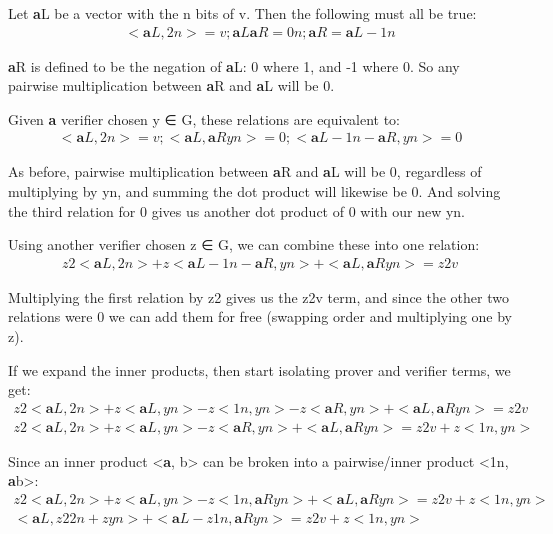 \documentclass{article}
\begin{document}
Let \textbf{a}L be a vector with the n bits of v.  Then the following must all be true:
\begin{eqnarray}
  <\textbf{a}L, 2n> = v ; \textbf{a}L \textbf{a}R = 0n ; \textbf{a}R = \textbf{a}L - 1n
\end{eqnarray}
  
\textbf{a}R is defined to be the negation of \textbf{a}L: 0 where 1, and -1 where 0.  So any pairwise multiplication between \textbf{a}R and \textbf{a}L will be 0.

Given \textbf{a} verifier chosen y ∈ G, these relations are equivalent to:
\begin{eqnarray}
  <\textbf{a}L, 2n> = v ; <\textbf{a}L,  \textbf{a}Ryn> = 0 ; <\textbf{a}L - 1n - \textbf{a}R, yn> = 0
\end{eqnarray}

As before, pairwise multiplication between \textbf{a}R and \textbf{a}L will be 0, regardless of multiplying by yn, and summing the dot product will likewise be 0. And solving the third relation for 0 gives us another dot product of 0 with our new yn.

Using another verifier chosen z ∈ G, we can combine these into one relation:
\begin{eqnarray}
  z2 <\textbf{a}L, 2n> + z <\textbf{a}L - 1n - \textbf{a}R, yn> + <\textbf{a}L,  \textbf{a}Ryn> = z2 v
\end{eqnarray}

Multiplying the first relation by z2 gives us the z2v term, and since the other two relations were 0 we can add them for free (swapping order and multiplying one by z).

If we expand the inner products, then start isolating prover and verifier terms, we get:
\begin{eqnarray}
  z2 <\textbf{a}L, 2n> + z <\textbf{a}L, yn> - z <1n, yn> - z <\textbf{a}R, yn> + <\textbf{a}L,  \textbf{a}Ryn> = z2 v\\
  z2 <\textbf{a}L, 2n> + z <\textbf{a}L, yn> - z <\textbf{a}R, yn> + <\textbf{a}L,  \textbf{a}Ryn> = z2 v + z <1n, yn>
\end{eqnarray}

Since an inner product <\textbf{a}, b> can be broken into a pairwise/inner product <1n, \textbf{a}b>:
\begin{eqnarray}
  z2 <\textbf{a}L, 2n> + z <\textbf{a}L, yn> - z <1n, \textbf{a}Ryn> + <\textbf{a}L,  \textbf{a}Ryn> = z2 v + z <1n, yn>\\
  <\textbf{a}L, z2 2n + z yn> + <\textbf{a}L - z 1n, \textbf{a}Ryn> = z2 v + z <1n, yn>
\end{eqnarray}
\end{document}
